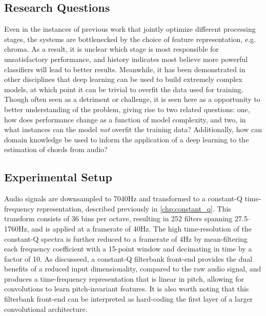\subsection{Research Questions}
\label{subsec:research_questions}

Even in the instances of previous work that jointly optimize different processing stages, the systems are bottlenecked by the choice of feature representation, e.g. chroma.
As a result, it is unclear which stage is most responsible for unsatisfactory performance, and history indicates most believe more powerful classifiers will lead to better results.
Meanwhile, it has been demonstrated in other disciplines that deep learning can be used to build extremely complex models, at which point it can be trivial to overfit the data used for training.
Though often seen as a detriment or challenge, it is seen here as a opportunity to better understanding of the problem, giving rise to two related questions: one, how does performance change as a function of model complexity, and two, in what instances can the model \emph{not} overfit the training data?
Additionally, how can domain knowledge be used to inform the application of a deep learning to the estimation of chords from audio?


\subsection{Experimental Setup}
\label{subsec:experimental_setup}

Audio signals are downsampled to 7040Hz and transformed to a constant-Q time-frequency representation, described previously in \ref{chp:constant_q}.
This transform consists of 36 bins per octave, resulting in 252 filters spanning 27.5--1760Hz, and is applied at a framerate of 40Hz.
The high time-resolution of the constant-Q spectra is further reduced to a framerate of 4Hz by mean-filtering each frequency coefficient with a 15-point window and decimating in time by a factor of 10.
As discusseed, a constant-Q filterbank front-end provides the dual benefits of a reduced input dimensionality, compared to the raw audio signal, and produces a time-frequency representation that is linear in pitch, allowing for convolutions to learn pitch-invariant features.
It is also worth noting that this filterbank front-end can be interpreted as hard-coding the first layer of a larger convolutional architecture.

